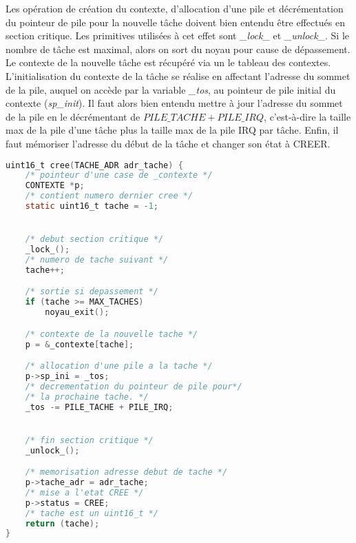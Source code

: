 Les opération de création du contexte, d'allocation d'une pile et décrémentation du pointeur de pile pour la nouvelle tâche doivent bien entendu être effectués en section critique. Les primitives utilisées à cet effet sont \textit{\_lock\_} et \textit{\_unlock\_}. Si le nombre de tâche est maximal, alors on sort du noyau pour cause de dépassement. Le contexte de la nouvelle tâche est récupéré via un le tableau des contextes. L'initialisation du contexte de la tâche se réalise en affectant l'adresse du sommet de la pile, auquel on accède par la variable \textit{\_tos}, au pointeur de pile initial du contexte (\textit{sp\_init}). Il faut alors bien entendu mettre à jour l'adresse du sommet de la pile en le décrémentant de $PILE\_TACHE + PILE\_IRQ$, c'est-à-dire la taille max de la pile d'une tâche plus la taille max de la pile IRQ par tâche.
Enfin, il faut mémoriser l'adresse du début de la tâche et changer son état à CREER.
\begin{lstlisting}[language=C, caption=noyau.c]
uint16_t cree(TACHE_ADR adr_tache) {
    /* pointeur d'une case de _contexte */
    CONTEXTE *p;
    /* contient numero dernier cree */
    static uint16_t tache = -1;


    /* debut section critique */
    _lock_();
    /* numero de tache suivant */
    tache++;

    /* sortie si depassement */
    if (tache >= MAX_TACHES)
        noyau_exit();

    /* contexte de la nouvelle tache */
    p = &_contexte[tache];

    /* allocation d'une pile a la tache */
    p->sp_ini = _tos;
    /* decrementation du pointeur de pile pour*/
    /* la prochaine tache. */
    _tos -= PILE_TACHE + PILE_IRQ;


    /* fin section critique */
    _unlock_();

    /* memorisation adresse debut de tache */
    p->tache_adr = adr_tache;
    /* mise a l'etat CREE */
    p->status = CREE;
    /* tache est un uint16_t */
    return (tache);
}
\end{lstlisting}

